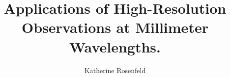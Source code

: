 \title{Applications of \newline High-Resolution Observations \newline at Millimeter Wavelengths.}
\author{Katherine Rosenfeld}


